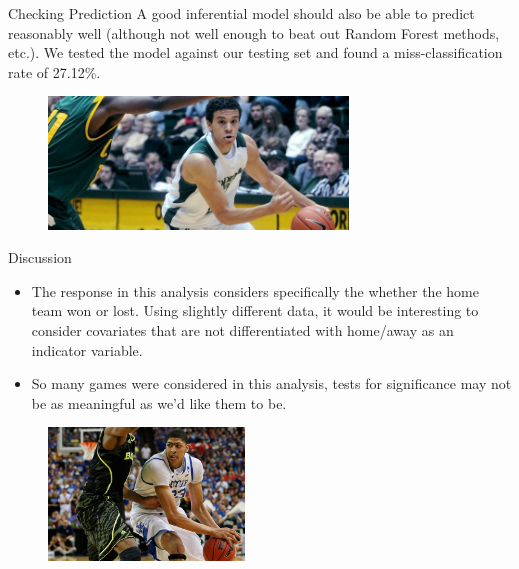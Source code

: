 \documentclass{beamer}
\begin{document}
\begin{frame}{Checking Prediction}
A good inferential model should also be able to predict reasonably well (although not well enough to beat out Random Forest methods, etc.). We tested the model against our testing set and found a miss-classification rate of 27.12\%. 
\begin{figure}
	\centering
	\includegraphics[height = 100pt]{dorian.jpg}
	\end{figure}
\end{frame}

\begin{frame}{Discussion}
\begin{itemize}
\item The response in this analysis considers specifically the whether the home team won or lost. Using slightly different data, it would be interesting to consider covariates that are not differentiated with home/away as an indicator variable.  

\item So many games were considered in this analysis, tests for significance may not be as meaningful as we'd like them to be. 
\end{itemize}
\begin{figure}
	\centering
	\includegraphics[height = 100pt]{unibrow.jpg}
\end{figure}
\end{frame}
\end{document}
